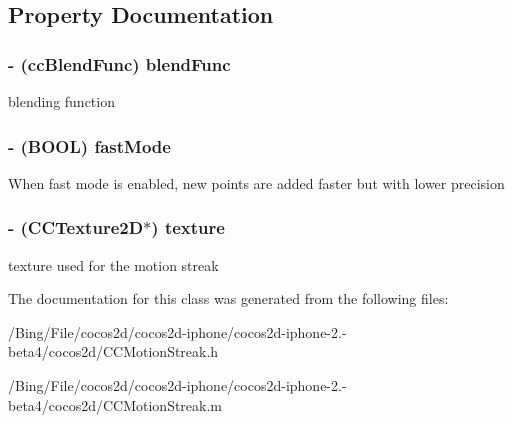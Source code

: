 \subsection{Property Documentation}
\hypertarget{interface_c_c_motion_streak_ad416284b4905208b9fd097ead67676ed}{
\subsubsection[{blend\-Func}]{\setlength{\rightskip}{0pt plus 5cm}-\/ ({\bf cc\-Blend\-Func}) {\bf blend\-Func}}}\label{interface_c_c_motion_streak_ad416284b4905208b9fd097ead67676ed}
blending function \hypertarget{interface_c_c_motion_streak_a846cf793fa172c061b1a0ec253ecae06}{
\subsubsection[{fast\-Mode}]{\setlength{\rightskip}{0pt plus 5cm}-\/ (B\-O\-O\-L) {\bf fast\-Mode}}}\label{interface_c_c_motion_streak_a846cf793fa172c061b1a0ec253ecae06}
When fast mode is enabled, new points are added faster but with lower precision \hypertarget{interface_c_c_motion_streak_a59685cc2f6f090df6e3a337ba18efead}{
\subsubsection[{texture}]{\setlength{\rightskip}{0pt plus 5cm}-\/ ({\bf C\-C\-Texture2\-D}$\ast$) {\bf texture}}}\label{interface_c_c_motion_streak_a59685cc2f6f090df6e3a337ba18efead}
texture used for the motion streak 

The documentation for this class was generated from the following files\-:\begin{DoxyCompactItemize}
\item 
/\-Bing/\-File/cocos2d/cocos2d-\/iphone/cocos2d-\/iphone-\/2.-\/beta4/cocos2d/C\-C\-Motion\-Streak.\-h\item 
/\-Bing/\-File/cocos2d/cocos2d-\/iphone/cocos2d-\/iphone-\/2.-\/beta4/cocos2d/C\-C\-Motion\-Streak.\-m\end{DoxyCompactItemize}
